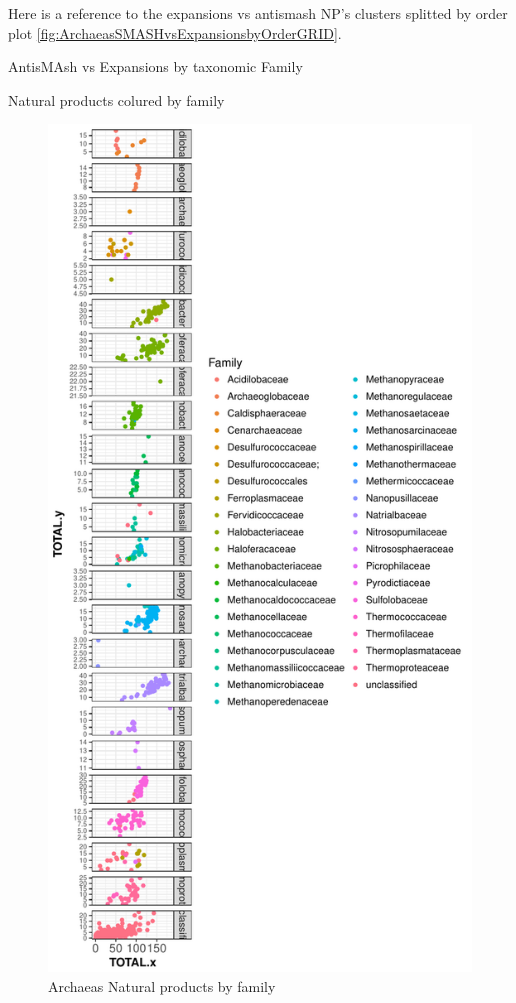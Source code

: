 \documentclass[12pt,twoside]{reedthesis}
\begin{document}
  Here is a reference to the expansions vs antismash NP's clusters
  splitted by order plot
  \autoref{fig:ArchaeasSMASHvsExpansionsbyOrderGRID}. \clearpage 
  
  AntisMAsh vs Expansions by taxonomic Family
  
  Natural products colured by family
  
  \begin{figure}[h!tbp]
  \centering
  \includegraphics[angle = 0,scale = 0.6]{chapter2/Archaeas/Archaeasnpf.pdf}
  \caption[Archaeas Natural products by family]{\normalsize{Archaeas Natural products by family}}
  \label{fig:Archaeasnpf}
  \end{figure}
  
\end{document}

